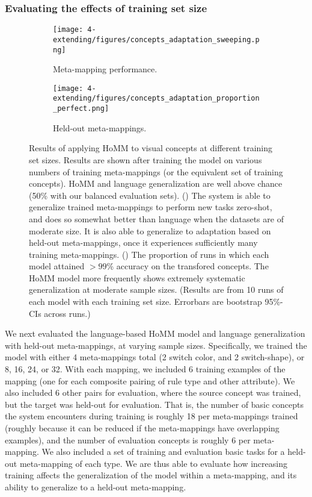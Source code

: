 \subsubsection{Evaluating the effects of training set size}
\begin{figure}
\centering
\begin{subfigure}{0.5\textwidth}
\texttt{[image: 4-extending/figures/concepts\_adaptation\_sweeping.png]}
\caption{Meta-mapping performance.}\label{fig:extending_concepts_sweeping_results:accuracy}
\end{subfigure}%
\begin{subfigure}{0.5\textwidth}
\texttt{[image: 4-extending/figures/concepts\_adaptation\_proportion\_perfect.png]}
\caption{Held-out meta-mappings.}\label{fig:extending_concepts_sweeping_results:perfect}
\end{subfigure}
\caption[Results of applying HoMM to visual concepts at different training set sizes.]{Results of applying HoMM to visual concepts at different training set sizes. Results are shown after training the model on various numbers of training meta-mappings (or the equivalent set of training concepts). HoMM and language generalization are well above chance (50\% with our balanced evaluation sets). () The system is able to generalize trained meta-mappings to perform new tasks zero-shot, and does so somewhat better than language when the datasets are of moderate size. It is also able to generalize to adaptation based on held-out meta-mappings, once it experiences sufficiently many training meta-mappings. () The proportion of runs in which each model attained \(> 99\)\% accuracy on the transfored concepts. The HoMM model more frequently shows extremely systematic generalization at moderate sample sizes. (Results are from 10 runs of each model with each training set size. Errorbars are bootstrap 95\%-CIs across runs.)} \label{fig:extending_concepts_sweeping_results}
\end{figure}

We next evaluated the language-based HoMM model and language generalization with held-out meta-mappings, at varying sample sizes. Specifically, we trained the model with either 4 meta-mappings total (2 switch color, and 2 switch-shape), or 8, 16, 24, or 32. With each mapping, we included 6 training examples of the mapping (one for each composite pairing of rule type and other attribute). We also included 6 other pairs for evaluation, where the source concept was trained, but the target was held-out for evaluation. That is, the number of basic concepts the system encounters during training is roughly 18 per meta-mappings trained (roughly because it can be reduced if the meta-mappings have overlapping examples), and the number of evaluation concepts is roughly 6 per meta-mapping. We also included a set of training and evaluation basic tasks for a held-out meta-mapping of each type. We are thus able to evaluate how increasing training affects the generalization of the model within a meta-mapping, and its ability to generalize to a held-out meta-mapping. \par

